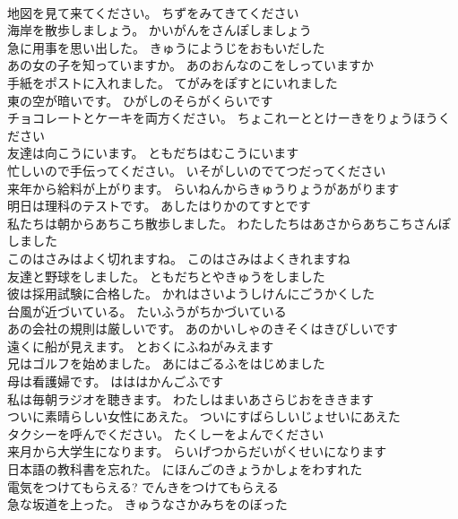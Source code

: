 \documentclass[8pt]{extreport}
\begin{document}
\begin{CJK}{UTF8}{min}
\\	地図を見て来てください。	ちずをみてきてください 
\\	海岸を散歩しましょう。	かいがんをさんぽしましょう 
\\	急に用事を思い出した。	きゅうにようじをおもいだした 
\\	あの女の子を知っていますか。	あのおんなのこをしっていますか 
\\	手紙をポストに入れました。	てがみをぽすとにいれました 
\\	東の空が暗いです。	ひがしのそらがくらいです 
\\	チョコレートとケーキを両方ください。	ちょこれーととけーきをりょうほうください 
\\	友達は向こうにいます。	ともだちはむこうにいます 
\\	忙しいので手伝ってください。	いそがしいのでてつだってください 
\\	来年から給料が上がります。	らいねんからきゅうりょうがあがります 
\\	明日は理科のテストです。	あしたはりかのてすとです 
\\	私たちは朝からあちこち散歩しました。	わたしたちはあさからあちこちさんぽしました 
\\	このはさみはよく切れますね。	このはさみはよくきれますね 
\\	友達と野球をしました。	ともだちとやきゅうをしました 
\\	彼は採用試験に合格した。	かれはさいようしけんにごうかくした 
\\	台風が近づいている。	たいふうがちかづいている 
\\	あの会社の規則は厳しいです。	あのかいしゃのきそくはきびしいです 
\\	遠くに船が見えます。	とおくにふねがみえます 
\\	兄はゴルフを始めました。	あにはごるふをはじめました 
\\	母は看護婦です。	はははかんごふです 
\\	私は毎朝ラジオを聴きます。	わたしはまいあさらじおをききます 
\\	ついに素晴らしい女性にあえた。	ついにすばらしいじょせいにあえた 
\\	タクシーを呼んでください。	たくしーをよんでください 
\\	来月から大学生になります。	らいげつからだいがくせいになります 
\\	日本語の教科書を忘れた。	にほんごのきょうかしょをわすれた 
\\	電気をつけてもらえる?	でんきをつけてもらえる 
\\	急な坂道を上った。	きゅうなさかみちをのぼった 

\end{CJK}
\end{document}
